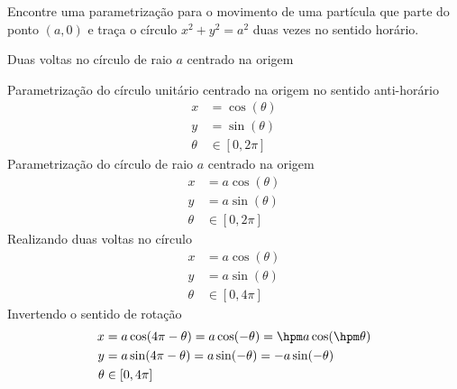\documentclass[a4paper,12pt,fleqn]{article}
\begin{document}

Encontre uma parametrização para o movimento de uma partícula que parte do
ponto \((a, 0)\) e traça o círculo \(x^2+y^2=a^2\) duas vezes no sentido horário.
\clearpagequestiononly

\begin{answer}
  Duas voltas no círculo de raio $a$ centrado na origem

  Parametrização do círculo unitário centrado na origem no sentido anti-horário
  \begin{align*}
    x      & = \cos(\theta) \\
    y      & = \sin(\theta) \\
    \theta & \in [0, 2\pi]
  \end{align*}
  Parametrização do círculo de raio $a$ centrado na origem
  \begin{align*}
    x      & = a\cos(\theta) \\
    y      & = a\sin(\theta) \\
    \theta & \in [0, 2\pi]
  \end{align*}
  Realizando duas voltas no círculo
  \begin{align*}
    x      & = a\cos(\theta) \\
    y      & = a\sin(\theta) \\
    \theta & \in [0, 4\pi]
  \end{align*}
  Invertendo o sentido de rotação
  \begin{align*}
    x      & = a\cos(4\pi -\theta) = a\cos(-\theta) = \hpm a\cos(\hpm\theta) \\
    y      & = a\sin(4\pi -\theta) = a\sin(-\theta) = -    a\sin(   -\theta) \\
    \theta & \in [0, 4\pi]
  \end{align*}
\end{answer}
\end{document}
